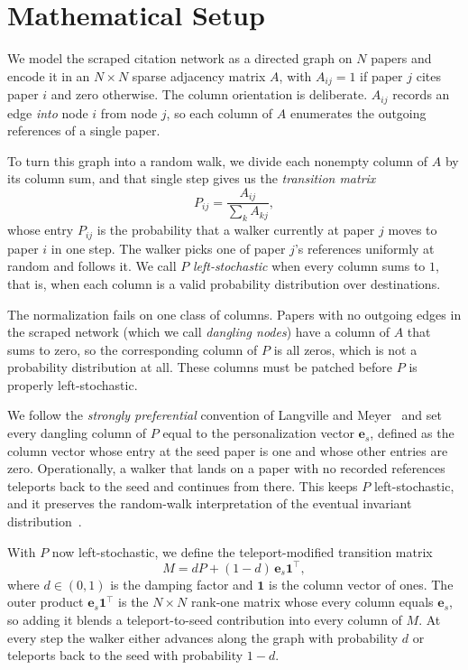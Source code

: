 \documentclass[conference]{IEEEtran}
\begin{document}
\section{Mathematical Setup}
\label{sec:setup}

We model the scraped citation network as a directed graph on $N$
papers and encode it in an $N \times N$ sparse adjacency matrix $A$,
with $A_{ij} = 1$ if paper $j$ cites paper $i$ and zero otherwise.
The column orientation is deliberate. $A_{ij}$ records an edge
\emph{into} node $i$ from node $j$, so each column of $A$
enumerates the outgoing references of a single paper.

To turn this graph into a random walk, we divide each nonempty
column of $A$ by its column sum, and that single step gives us
the \emph{transition matrix}
\begin{equation}
  P_{ij} = \frac{A_{ij}}{\sum_{k} A_{kj}},
\end{equation}
whose entry $P_{ij}$ is the probability that a walker currently at
paper $j$ moves to paper $i$ in one step. The walker picks one of
paper $j$'s references uniformly at random and follows it. We call
$P$ \emph{left-stochastic} when every column sums to $1$, that
is, when each column is a valid probability distribution over
destinations.

The normalization fails on one class of columns. Papers with no
outgoing edges in the scraped network (which we call \emph{dangling
nodes}) have a column of $A$ that sums to zero, so the
corresponding column of $P$ is all zeros, which is not a
probability distribution at all. These columns must be patched
before $P$ is properly left-stochastic.

We follow the \emph{strongly preferential} convention of
Langville and Meyer~\cite{langville2004deeper} and set every
dangling column of $P$ equal to the personalization vector
$\mathbf{e}_s$, defined as the column vector whose entry at the
seed paper is one and whose other entries are zero. Operationally, a walker
that lands on a paper with no recorded references teleports
back to the seed and continues from there. This keeps $P$
left-stochastic, and it preserves the random-walk
interpretation of the eventual invariant
distribution~\cite{gleich2015pagerank}.

With $P$ now left-stochastic, we define the teleport-modified transition
matrix
\begin{equation}
  M = dP + (1 - d)\,\mathbf{e}_s \mathbf{1}^\top,
\end{equation}
where $d \in (0,1)$ is the damping factor and $\mathbf{1}$ is the
column vector of ones. The outer product $\mathbf{e}_s
\mathbf{1}^\top$ is the $N \times N$ rank-one matrix whose every
column equals $\mathbf{e}_s$, so adding it blends a
teleport-to-seed contribution into every column of $M$. At
every step the walker either advances along the graph with
probability $d$ or teleports back to the seed with probability
$1 - d$.
\end{document}
